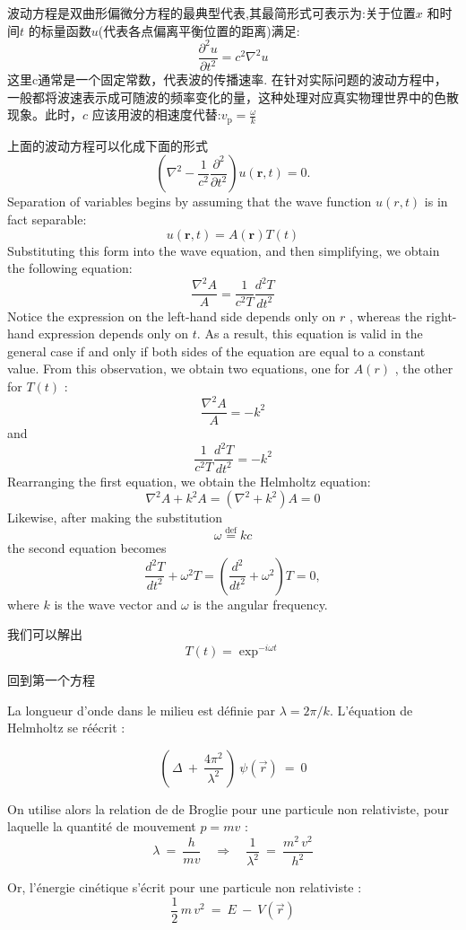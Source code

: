 \documentclass[openany]{book}
\begin{document}
波动方程是双曲形偏微分方程的最典型代表,其最简形式可表示为:关于位置$x$ 和时间$t$ 的标量函数$u$(代表各点偏离平衡位置的距离)满足:
$$
\dfrac{\partial^2 u}{\partial t^2} = c^2 \nabla^2u
$$
这里c通常是一个固定常数，代表波的传播速率.
在针对实际问题的波动方程中，一般都将波速表示成可随波的频率变化的量，这种处理对应真实物理世界中的色散现象。此时，$ c$  应该用波的相速度代替:$v_\mathrm{p} = \frac{\omega}{k}$

上面的波动方程可以化成下面的形式
$$
\left(\nabla^2-\frac{1}{c^2}\frac{\partial^2}{\partial{t}^2}\right)u(\mathbf{r},t)=0.
$$
Separation of variables begins by assuming that the wave function $u(r, t)$ is in fact separable:
$$u(\mathbf{r},t)=A (\mathbf{r}) T(t)$$
Substituting this form into the wave equation, and then simplifying, we obtain the following equation:
$$\dfrac{\nabla^2 A}{A} = \dfrac{1}{c^2 T } \dfrac{d^2 T}{d t^2}$$
Notice the expression on the left-hand side depends only on $r$ , whereas the right-hand expression depends only on $t$.
As a result, this equation is valid in the general case if and only if both sides of the equation are equal to a constant value. 
From this observation, we obtain two equations, one for $A(r)$ , the other for $T(t)$ :
$$\dfrac{\nabla^2 A}{A} = -k^2$$
and
$$\dfrac{1}{c^2 T } \dfrac{d^2 T}{d t^2} = -k^2$$
Rearranging the first equation, we obtain the Helmholtz equation:
$$\nabla^2 A + k^2 A  =  ( \nabla^2 + k^2)  A  =  0$$
Likewise, after making the substitution
$$ \omega  \stackrel{\mathrm{def}}{=}  kc $$
the second equation becomes
$$\frac{d^2{T}}{d{t}^2} + \omega^2T  =  \left( \dfrac{d^2 }{dt^2 } + \omega^2 \right) T  =  0,$$
where $k$ is the wave vector and $\omega$ is the angular frequency.\par
我们可以解出
$$
T(t) = \exp^{-i \omega t}
$$

回到第一个方程\par
La longueur d'onde dans le milieu est d\'efinie par $\lambda = 2 \pi/k$. L'\'equation de Helmholtz se r\'e\'ecrit :

$$
\left( \, \Delta \ + \ \frac{4\pi^2}{\lambda^2} \, \right) \ \psi(\vec{r}) \ = \ 0
$$

On utilise alors la relation de de Broglie pour une particule non relativiste, pour laquelle la quantit\'e de mouvement $p = m v$  :
$$
\lambda \ = \ \frac{h}{mv} \quad \Longrightarrow \quad \frac{1}{\lambda^2} \ = \ \frac{m^2 \, v^2}{h^2}
$$

Or, l'\'energie cin\'etique s'\'ecrit pour une particule non relativiste :
$$
\frac{1}{2} \, m \, v^2 \ = \ E \ - \ V(\vec{r})
$$
\end{document}
